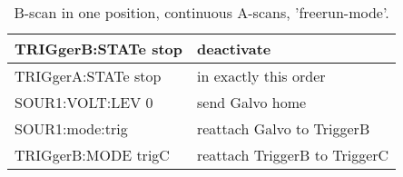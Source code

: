		\begin{table}[h!]
		\scriptsize
			 \begin{tabular}{|p{5.5cm}|p{6cm}|} \hline
			TRIGgerB:STATe stop	& deactivate	\\ \hline
			TRIGgerA:STATe stop	& in exactly this order	\\ \hline
			SOUR1:VOLT:LEV 0	& send Galvo home	\\ \hline
			SOUR1:mode:trig		& reattach Galvo to TriggerB	\\ \hline
			TRIGgerB:MODE trigC & reattach TriggerB to TriggerC \\ \hline
			 \end{tabular}
			 \caption{B-scan in one position, continuous A-scans, 'freerun-mode'.}
		\end{table}
